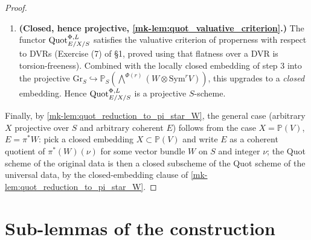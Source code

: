 \begin{proof}
\begin{enumerate}
      \Phi(r))\) with universal quotient
      \(f : (W \otimes \mathrm{Sym}^r V)_{T_0} \twoheadrightarrow \mathcal{J}\)
      and kernel \(\mathcal{K}\). Form the composite
      \(h : \pi_{T_0}^* \mathcal{K} \hookrightarrow
      \pi_{T_0}^* (W \otimes \mathrm{Sym}^r V) = \pi_{T_0}^* (\pi_{T_0})_* E_{T_0}
      \twoheadrightarrow E_{T_0}\)
      and let \(q := \mathrm{coker}(h) : E_{T_0} \to \mathcal{F}\). By the
      flattening stratification (\ref{mk-thm:flattening_stratification_exists}
      of \ref{mk-chap:Picard_FlatteningStratification}) applied to \(\mathcal{F}\)
      on \(X_{T_0}\), there exists a locally closed subscheme
      \(T_0^\Phi \subseteq T_0\) such that for any \(\phi : Y \to T_0\), the
      pulled-back cokernel \(\mathcal{F}_Y\) is \(Y\)-flat with fiberwise
      Hilbert polynomial \(\Phi\) iff \(\phi\) factors through \(T_0^\Phi\).
      The pair \((T_0^\Phi, \text{universal cokernel})\) represents
      \(\Quot^{\Phi,L}_{E/X/S}\).
    \item \textbf{(Closed, hence projective,
      \ref{mk-lem:quot_valuative_criterion}.)} The functor
      \(\Quot^{\Phi,L}_{E/X/S}\) satisfies the valuative criterion of
      properness with respect to DVRs (Exercise (7) of \S 1, proved
      using that flatness over a DVR is torsion-freeness). Combined
      with the locally closed embedding of step 3 into the projective
      \(\mathrm{Gr}_S \hookrightarrow \mathbb{P}_S(\bigwedge^{\Phi(r)}
      (W \otimes \mathrm{Sym}^r V))\), this upgrades to a \emph{closed}
      embedding. Hence \(\Quot^{\Phi,L}_{E/X/S}\) is a projective \(S\)-scheme.
  \end{enumerate}
  Finally, by \ref{mk-lem:quot_reduction_to_pi_star_W}, the general case
  (arbitrary \(X\) projective over \(S\) and arbitrary coherent \(E\)) follows
  from the case \(X = \mathbb{P}(V)\), \(E = \pi^* W\): pick a closed
  embedding \(X \subset \mathbb{P}(V)\) and write \(E\) as a coherent quotient
  of \(\pi^*(W)(\nu)\) for some vector bundle \(W\) on \(S\) and integer \(\nu\);
  the Quot scheme of the original data is then a closed subscheme of the
  Quot scheme of the universal data, by the closed-embedding clause of
  \ref{mk-lem:quot_reduction_to_pi_star_W}.
\end{proof}

\section{Sub-lemmas of the construction}
\label{mk-sec:quot_sub_lemmas}

